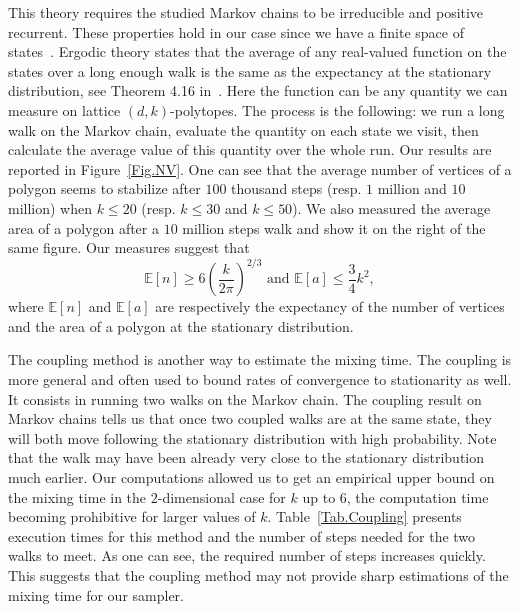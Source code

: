 \documentclass[a4paper]{article}
\begin{document}
This theory requires the studied Markov chains to be irreducible and positive recurrent. These properties hold in our case since we have a finite space of states~\cite{levin2009markov}. Ergodic theory states that the average of any real-valued function on the states over a long enough walk is the same as the expectancy at the stationary distribution, see Theorem 4.16 in~\cite{levin2009markov}. Here the function can be any quantity we can measure on lattice $(d,k)$-polytopes. The process is the following: we run a long walk on the Markov chain, evaluate the quantity on each state we visit, then calculate the average value of this quantity over the whole run.
Our results are reported in Figure~\ref{Fig.NV}. One can see that the average number of vertices of a polygon seems to stabilize after $100$ thousand steps (resp. $1$ million and $10$ million) when $k\leq 20$ (resp. $k\leq 30$ and $k\leq 50$).
We also measured the average area of a polygon after a $10$ million steps walk and show it on the right of the same figure. Our measures suggest that
$$
\mathbb{E}[n] \ge 6\left(\frac{k}{2\pi}\right)^{2/3} \text{ and } \mathbb{E}[a] \leq \frac{3}{4} k^2,
$$
where $\mathbb{E}[n]$ and $\mathbb{E}[a]$ are respectively the expectancy of the number of vertices and the area of a polygon at the stationary distribution.

The coupling method is another way to estimate the mixing time. The coupling is more general and often used to bound rates of convergence to stationarity as well. It consists in running two walks on the Markov chain.
The coupling result on Markov chains tells us that once two coupled walks are at the same state, they will both move following the stationary distribution with high probability. Note that the walk may have been already very close to the stationary distribution much earlier.
Our computations allowed us to get an empirical upper bound on the  mixing time in the $2$-dimensional case for $k$ up to $6$, the computation time becoming prohibitive for larger values of $k$.
Table~\ref{Tab.Coupling} presents execution times for this method and the number of steps needed for the two walks to meet.
As one can see, the required number of steps increases quickly. This suggests that the coupling method may not provide sharp estimations of the mixing time for our sampler.
\end{document}
